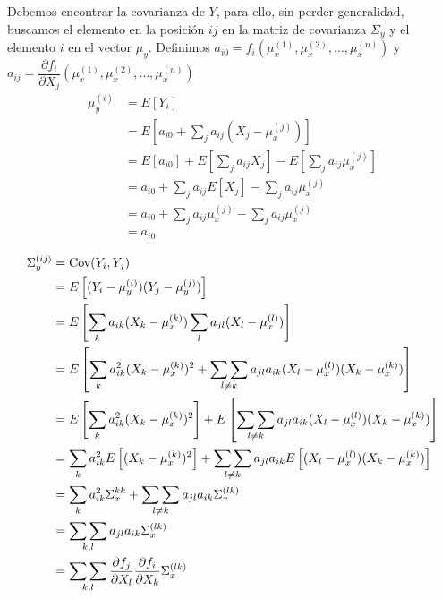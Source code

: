 \documentclass[a4paper, 10pt]{article}
\begin{document}
Debemos encontrar la covarianza de $Y$, para ello, sin perder generalidad, buscamos el elemento
en la posición $ij$ en la matriz de covarianza $\Sigma_y$ y el elemento $i$ en el vector $\mu_y$.
Definimos $a_{i0} = f_i(\mu_x^{(1)}, \mu_x^{(2)},\dots,\mu_x^{(n)})$ y $a_{ij} = \dfrac{\partial f_i}{\partial X_j}(\mu_x^{(1)}, \mu_x^{(2)}, \dots,\mu_x^{(n)})$
\begin{equation}
    \begin{split}
        \mu_y^{(i)} &= E\left[Y_i\right] \\
        &=E\left[a_{i0} + \sum_{j}{a_{ij}(X_j-\mu_x^{(j)})}\right] \\
        &=E\left[a_{i0}\right] + E\left[\sum_{j}{a_{ij}X_j}\right] - E\left[\sum_{j}{a_{ij}\mu_x^{(j)}}\right] \\
        &=a_{i0} + \sum_{j}a_{ij}E\left[{X_j}\right] - \sum_{j}a_{ij}\mu_x^{(j)} \\
        &=a_{i0} + \sum_{j}a_{ij}\mu_x^{(j)} - \sum_{j}a_{ij}\mu_x^{(j)} \\
        &=a_{i0} \\
    \end{split}
\end{equation}
\begin{equation}
    \begin{split}
        \Sigma_y^{(ij)} &= \textnormal{Cov}(Y_i, Y_j) \\
        &=E\left[(Y_i-\mu_y^{(i)})(Y_j-\mu_y^{(j)})\right] \\
        &=E\left[\sum_{k}{a_{ik}(X_k-\mu_x^{(k)})}\sum_{l}{a_{jl}(X_l-\mu_x^{(l)})}\right] \\
        &=E\left[\sum_{k}{a_{ik}^{2}(X_k-\mu_x^{(k)})^{2}} + \mathop{\sum\sum}_{l\neq k}{a_{jl}a_{ik}(X_l-\mu_x^{(l)})(X_k-\mu_x^{(k)})}\right] \\
        &=E\left[\sum_{k}{a_{ik}^{2}(X_k-\mu_x^{(k)})^{2}}\right]+E\left[\mathop{\sum\sum}_{l\neq k}{a_{jl}a_{ik}(X_l-\mu_x^{(l)})(X_k-\mu_x^{(k)})}\right] \\
        &=\sum_{k}a_{ik}^{2}E\left[{(X_k-\mu_x^{(k)})^{2}}\right]+\mathop{\sum\sum}_{l\neq k}a_{jl}a_{ik}E\left[{(X_l-\mu_x^{(l)})(X_k-\mu_x^{(k)})}\right] \\
        &=\sum_{k}a_{ik}^{2}\Sigma_x^{kk}+\mathop{\sum\sum}_{l\neq k}a_{jl}a_{ik}\Sigma_x^{(lk)} \\
        &=\mathop{\sum\sum}_{k,l}{a_{jl}a_{ik}\Sigma_x^{(lk)}} \\
        &=\mathop{\sum\sum}_{k,l}{\dfrac{\partial f_j}{\partial X_l} \dfrac{\partial f_i}{\partial X_k}\Sigma_x^{(lk)}}
    \end{split}
\end{equation}
\end{document}
